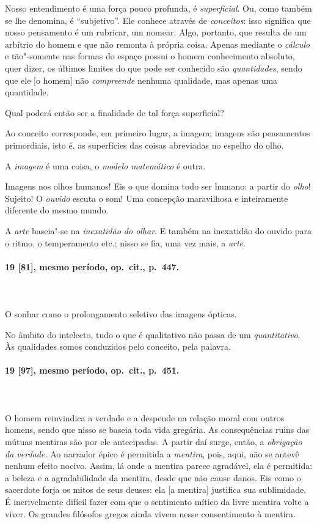 Nosso entendimento é uma força pouco profunda, é \textit{superficial}.
Ou, como também se lhe denomina, é “subjetivo”. Ele conhece através de
\textit{conceitos}: isso significa que nosso pensamento é um rubricar,
um nomear. Algo, portanto, que resulta de um arbítrio do homem e que
não remonta à própria coisa. Apenas mediante o \textit{cálculo} e
tão"-somente nas formas do espaço possui o homem conhecimento absoluto,
quer dizer, os últimos limites do que pode ser conhecido são
\textit{quantidades}, sendo que ele [o homem] não \textit{compreende}
nenhuma qualidade, mas apenas uma quantidade. 

Qual poderá então ser a finalidade de tal força superficial? 

Ao conceito corresponde, em primeiro lugar, a imagem; imagens são
pensamentos primordiais, isto é, as superfícies das coisas abreviadas
no espelho do olho.

A \textit{imagem} é uma coisa, o \textit{modelo matemático} é outra.

Imagens nos olhos humanos! Eis o que domina todo ser humano: a partir do
\textit{olho}! Sujeito! O \textit{ouvido} escuta o som! Uma concepção
maravilhosa e inteiramente diferente do mesmo mundo.

A \textit{arte} baseia"-se na \textit{inexatidão do olhar}. E também na
inexatidão do ouvido para o ritmo, o temperamento etc.; nisso se fia,
uma vez mais, a \textit{arte}. 

\pagebreak
\paragraph*{19 [81], mesmo período, op.~cit., p.~447.}
\ \\
\ \\

O sonhar como o prolongamento seletivo das imagens ópticas.

No âmbito do intelecto, tudo o que é qualitativo não passa de um
\textit{quantitativo}. Às qualidades somos conduzidos pelo conceito,
pela palavra.

\pagebreak
\paragraph*{19 [97], mesmo período, op.~cit., p.~451.}
\ \\
\ \\

O homem reinvindica a verdade e a despende na relação moral com outros
homens, sendo que nisso se baseia toda vida gregária. As consequências
ruins das mútuas mentiras são por ele antecipadas. A partir daí surge,
então, a \textit{obrigação da verdade.} Ao narrador épico é permitida a
\textit{mentira}, pois, aqui, não se antevê nenhum efeito nocivo. 
Assim, lá onde a mentira parece agradável, ela é permitida: a beleza e
a agradabilidade da mentira, desde que não cause danos. Eis como o
sacerdote forja os mitos de seus deuses: ela [a mentira] justifica sua
sublimidade. É incrivelmente difícil fazer com que o sentimento mítico
da livre mentira volte a viver. Os grandes filósofos gregos ainda vivem
nesse consentimento à mentira.

